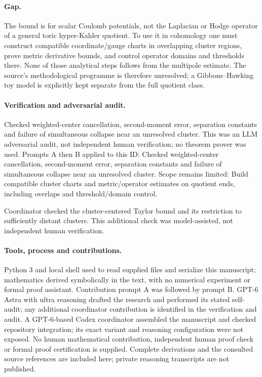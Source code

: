 \documentclass[11pt]{article}
\begin{document}
\paragraph{Gap.}The bound is for scalar Coulomb potentials, not the Laplacian or Hodge operator of a general toric hyper-Kahler quotient. To use it in cohomology one must construct compatible coordinate/gauge charts in overlapping cluster regions, prove metric derivative bounds, and control operator domains and thresholds there. None of those analytical steps follows from the multipole estimate. The source's methodological programme is therefore unresolved; a Gibbons--Hawking toy model is explicitly kept separate from the full quotient class.

\paragraph{Verification and adversarial audit.}
Checked weighted-center cancellation, second-moment error, separation constants and failure of simultaneous collapse near an unresolved cluster. This was an LLM adversarial audit, not independent human verification; no theorem prover was used. Prompts A then B applied to this ID: Checked weighted-center cancellation, second-moment error, separation constants and failure of simultaneous collapse near an unresolved cluster. Scope remains limited: Build compatible cluster charts and metric/operator estimates on quotient ends, including overlaps and threshold/domain control.

Coordinator checked the cluster-centered Taylor bound and its restriction to sufficiently distant clusters. This additional check was model-assisted, not independent human verification.

\paragraph{Tools, process and contributions.}
Python 3 and local shell used to read supplied files and serialize this manuscript; mathematics derived symbolically in the text, with no numerical experiment or formal proof assistant. Contribution prompt A was followed by prompt B. GPT-6 Astra with ultra reasoning drafted the research and performed its stated self-audit; any additional coordinator contribution is identified in the verification and audit. A GPT-6-based Codex coordinator assembled the manuscript and checked repository integration; its exact variant and reasoning configuration were not exposed. No human mathematical contribution, independent human proof check or formal proof certification is supplied. Complete derivations and the consulted source references are included here; private reasoning transcripts are not published.
\end{document}
